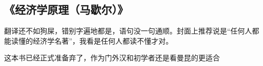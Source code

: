 \subsection{《经济学原理（马歇尔）》}
翻译还不如狗屎，错别字遍地都是，语句没一句通顺。封面上推荐说是“任何人都能读懂的经济学名著”，我看是任何人都读不懂才对。

这本书已经正式准备弃了，作为门外汉和初学者还是看曼昆的更适合